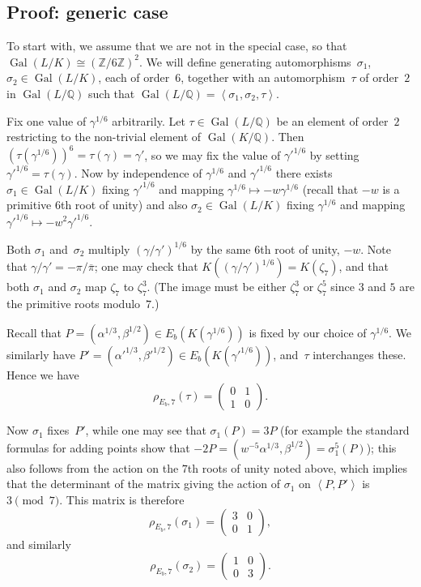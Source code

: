 \documentclass[12pt]{amsart}
\newcommand{\Q}{\mathbb{Q}}
\newcommand{\Z}{\mathbb{Z}}
\DeclareMathOperator{\Gal}{Gal}
\def\pibar{\overline{\pi}}
\numberwithin{equation}{section}
\theoremstyle{definition}
\theoremstyle{remark}
\begin{document}
\subsection{Proof: generic case}

To start with, we assume that we are not in the special case, so that
$\Gal(L/K)\cong(\Z/6\Z)^2$.  We will define generating
automorphisms~$\sigma_1$, $\sigma_2\in\Gal(L/K)$, each of order~$6$, together
with an automorphism~$\tau$ of order~$2$ in $\Gal(L/\Q)$ such that
$\Gal(L/\Q)=\left<\sigma_1,\sigma_2,\tau\right>$.

Fix one value of $\gamma^{1/6}$ arbitrarily.  Let $\tau\in\Gal(L/\Q)$
be an element of order~$2$ restricting to the non-trivial element of
$\Gal(K/\Q)$.  Then $(\tau(\gamma^{1/6}))^6=\tau(\gamma)=\gamma'$, so
we may fix the value of $\gamma'^{1/6}$ by setting
$\gamma'^{1/6}=\tau(\gamma)$.  Now by independence of $\gamma^{1/6}$
and $\gamma'^{1/6}$ there exists $\sigma_1\in\Gal(L/K)$ fixing
$\gamma'^{1/6}$ and mapping $\gamma^{1/6}\mapsto-w\gamma^{1/6}$ (recall
that $-w$ is a primitive $6$th root of unity) and also
$\sigma_2\in\Gal(L/K)$ fixing $\gamma^{1/6}$ and mapping
$\gamma'^{1/6}\mapsto-w^2\gamma'^{1/6}$.

Both $\sigma_1$ and~$\sigma_2$ multiply $(\gamma/\gamma')^{1/6}$ by
the same $6$th root of unity, $-w$.  Note that
$\gamma/\gamma'=-\pi/\pibar$; one may check that
$K((\gamma/\gamma')^{1/6})=K(\zeta_7)$, and that both $\sigma_1$ and
$\sigma_2$ map $\zeta_7$ to $\zeta_7^3$.  (The image must be either
$\zeta_7^3$ or $\zeta_7^5$ since $3$ and $5$ are the primitive roots
modulo~$7$.)

Recall that $P=(\alpha^{1/3},\beta^{1/2})\in E_b(K(\gamma^{1/6}))$ is
fixed by our choice of $\gamma^{1/6}$.  We similarly have
$P'=(\alpha'^{1/3},\beta'^{1/2})\in E_b(K(\gamma'^{1/6}))$, and~$\tau$
interchanges these.  Hence we have
\[
   \rho_{E_b,7}(\tau) = \begin{pmatrix}0&1\\1&0   \end{pmatrix}.
\]


Now $\sigma_1$ fixes~$P'$, while one may see that $\sigma_1(P)=3P$
(for example the standard formulas for adding points show that
$-2P=(w^{-5}\alpha^{1/3},\beta^{1/2})=\sigma_1^5(P)$); this also
follows from the action on the $7$th roots of unity noted above, which
implies that the determinant of the matrix giving the action of
$\sigma_1$ on $\left<P,P'\right>$ is $3\pmod7$.  This matrix is
therefore
\[
   \rho_{E_b,7}(\sigma_1) = \begin{pmatrix}3&0\\0&1   \end{pmatrix},
\]
and similarly
\[
   \rho_{E_b,7}(\sigma_2) = \begin{pmatrix}1&0\\0&3   \end{pmatrix}.
\]
\end{document}
